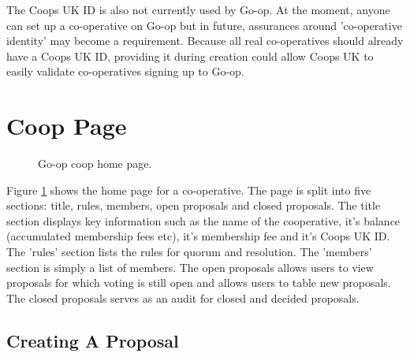 The Coops UK ID is also not currently used by Go-op. At the moment, anyone can set up a co-operative on Go-op but in future, assurances around 'co-operative identity' may become a requirement. Because all real co-operatives should already have a Coops UK ID, providing it during creation could allow Coops UK to easily validate co-operatives signing up to Go-op.\\
 

\section{Coop Page}

\begin{figure}
\centering
{}
\decoRule
\caption[Go-op Coop Home Page]{Go-op coop home page.}
\label{fig:cooppage}
\end{figure}

Figure \ref{fig:cooppage} shows the home page for a co-operative. The page is split into five sections: title, rules, members, open proposals and closed proposals. The title section displays key information such as the name of the cooperative, it's balance (accumulated membership fees etc), it's membership fee and it's Coops UK ID. The 'rules' section lists the rules for quorum and resolution. The 'members' section is simply a list of members. The open proposals allows users to view proposals for which voting is still open and allows users to table new proposals. The closed proposals serves as an audit for closed and decided proposals. \\

\subsection{Creating A Proposal}

